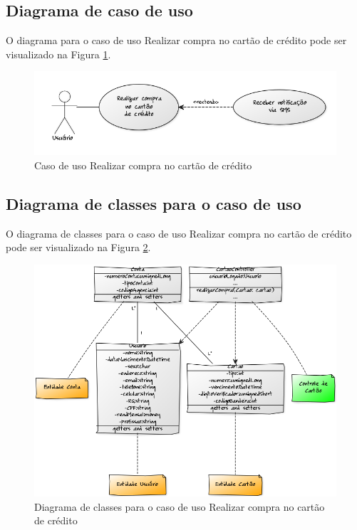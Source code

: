 \subsection{Diagrama de caso de uso}

O diagrama para o caso de uso Realizar compra no cartão de crédito pode ser visualizado na Figura \ref{cdu:compraCartaoCredito}.

\begin{figure}[!htb]
     \centering
     \includegraphics[scale=0.6]{diagramas/caso-de-uso/imagens/realizarCompraCartao.png}
     \caption{Caso de uso Realizar compra no cartão de crédito}
     \label{cdu:compraCartaoCredito}
\end{figure}

\subsection{Diagrama de classes para o caso de uso}

O diagrama de classes para o caso de uso Realizar compra no cartão de crédito pode ser visualizado na Figura \ref{ddc:compraCartao}.

\begin{figure}[!htb]
     \centering
     \includegraphics[scale=0.5]{diagramas/diagrama-de-classe/imagens/compraCartao.png}
     \caption{Diagrama de classes para o caso de uso Realizar compra no cartão de crédito}
     \label{ddc:compraCartao}
\end{figure}

